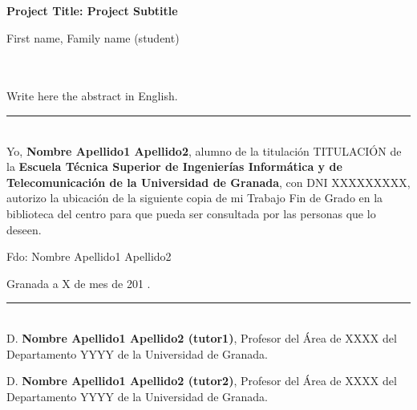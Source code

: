 \cleardoublepage


\begin{center}
{\large\bfseries Project Title: Project Subtitle}\\
\end{center}
\begin{center}
First name, Family name (student)\\
\end{center}

\\

\vspace{0.7cm}
\\

Write here the abstract in English.

\cleardoublepage
\thispagestyle{empty}

\noindent\rule[-1ex]{\textwidth}{2pt}\\[4.5ex]

Yo, \textbf{Nombre Apellido1 Apellido2}, alumno de la titulación TITULACIÓN de la \textbf{Escuela Técnica Superior
de Ingenierías Informática y de Telecomunicación de la Universidad de Granada}, con DNI XXXXXXXXX, autorizo la
ubicación de la siguiente copia de mi Trabajo Fin de Grado en la biblioteca del centro para que pueda ser
consultada por las personas que lo deseen.

\vspace{6cm}

\noindent Fdo: Nombre Apellido1 Apellido2

\vspace{2cm}

\begin{flushright}
Granada a X de mes de 201 .
\end{flushright}

\cleardoublepage
\thispagestyle{empty}

\noindent\rule[-1ex]{\textwidth}{2pt}\\[4.5ex]

D. \textbf{Nombre Apellido1 Apellido2 (tutor1)}, Profesor del Área de XXXX del Departamento YYYY de la Universidad de Granada.

\vspace{0.5cm}

D. \textbf{Nombre Apellido1 Apellido2 (tutor2)}, Profesor del Área de XXXX del Departamento YYYY de la Universidad de Granada.


